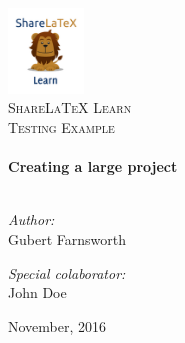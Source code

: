 \begin{titlepage}
\vbox{ }

\vbox{ }

\begin{center}
\includegraphics[width=0.15\textwidth]{./img/lion-logo.png}\\[1cm]
\textsc{\LARGE ShareLaTeX Learn}\\[1.5cm]
\textsc{\Large Testing Example}\\[0.5cm]

\vbox{ }
\HRule \\[0.4cm]
{ \huge \bfseries Creating a large project}\\[0.4cm]
\HRule \\[1.5cm]
\begin{minipage}{0.4\textwidth}
\begin{flushleft} \large
\emph{Author:}\\
Gubert Farnsworth
\end{flushleft}
\end{minipage}
\begin{minipage}{0.4\textwidth}
\begin{flushright} \large
\emph{Special colaborator:} \\
John Doe
\end{flushright}
\end{minipage}
\vfill
{\large November, 2016}
\end{center}
\end{titlepage}